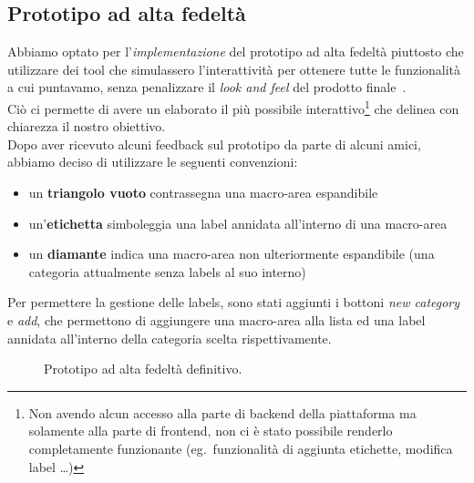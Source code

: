 \documentclass[12pt]{article} %
\begin{document}
\subsection{Prototipo ad alta fedelt\`a}
Abbiamo optato per l'\emph{implementazione} del prototipo ad alta fedelt\`a piuttosto che utilizzare dei tool che simulassero l'interattivit\`a per ottenere tutte le funzionalit\`a a cui puntavamo, senza penalizzare il \emph{look and feel} del prodotto finale~\cite[p.~263]{InteractionDesign}.\\
Ci\`o ci permette di avere un elaborato il pi\`u possibile interattivo\footnote{Non avendo alcun accesso alla parte di backend della piattaforma ma solamente alla parte di frontend, non ci \`e stato possibile renderlo completamente funzionante (eg.\ funzionalit\`a di aggiunta etichette, modifica label \dots)} che delinea con chiarezza il nostro obiettivo.\\
Dopo aver ricevuto alcuni feedback sul prototipo da parte di alcuni amici, abbiamo deciso di utilizzare le seguenti convenzioni:
\begin{itemize}
\item un \textbf{triangolo vuoto} contrassegna una macro-area espandibile
\item un'\textbf{etichetta} simboleggia una label annidata all'interno di una macro-area
\item un \textbf{diamante} indica una macro-area non ulteriormente espandibile (una categoria attualmente senza labels al suo interno)
\end{itemize}
Per permettere la gestione delle labels, sono stati aggiunti i bottoni \emph{new category} e \emph{add}, che permettono di aggiungere una macro-area alla lista ed una label annidata all'interno della categoria scelta rispettivamente.

\begin{figure}[H]
\caption{Prototipo ad alta fedelt\`a definitivo.}
\label{fig:dopo}
\end{figure}
\end{document}
